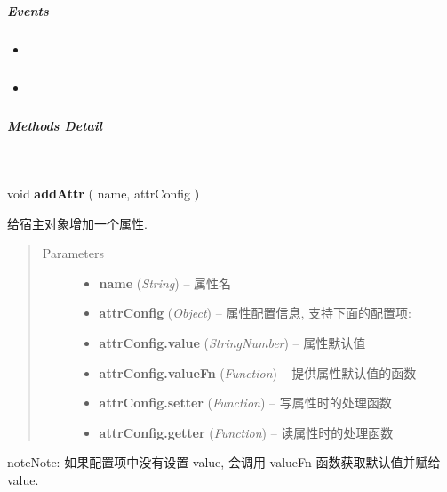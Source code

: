 \documentclass[letterpaper,10pt,english]{sphinxmanual}
\begin{document}
\subparagraph{Events}
\label{api/core/base/attribute:events}\begin{itemize}
\item {}
{\hyperref[api/core/base/attribute:attribute.beforeAttrNameChange]{}}

\item {}
{\hyperref[api/core/base/attribute:attribute.afterAttrNameChange]{}}

\end{itemize}


\subparagraph{Methods Detail}
\label{api/core/base/attribute:methods-detail}

\begin{fulllineitems}
\label{api/core/base/attribute:attribute.addAttr}~
\begin{DUlineblock}{0em}
\item[] void \textbf{addAttr} ( name, attrConfig )
\item[] 给宿主对象增加一个属性.
\end{DUlineblock}
\begin{quote}\begin{description}
\item[{Parameters}] \leavevmode\begin{itemize}
\item {}
\textbf{name} (\emph{String}) -- 属性名

\item {}
\textbf{attrConfig} (\emph{Object}) -- 属性配置信息, 支持下面的配置项:

\item {}
\textbf{attrConfig.value} (\emph{String\textbar{}Number}) -- 属性默认值

\item {}
\textbf{attrConfig.valueFn} (\emph{Function}) -- 提供属性默认值的函数

\item {}
\textbf{attrConfig.setter} (\emph{Function}) -- 写属性时的处理函数

\item {}
\textbf{attrConfig.getter} (\emph{Function}) -- 读属性时的处理函数

\end{itemize}

\end{description}\end{quote}

\begin{notice}{note}{Note:}
如果配置项中没有设置 value, 会调用 valueFn 函数获取默认值并赋给 value.
\end{notice}

\end{fulllineitems}
\end{document}

